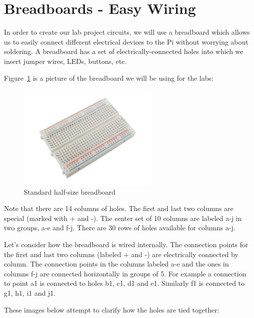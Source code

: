 \pagebreak

\section{Breadboards - Easy Wiring}


In order to create our lab project circuits, we will use
a breadboard which allows us to easily connect different
electrical devices to the Pi without worrying about soldering. A breadboard has a set of electrically-connected
holes into which we insert jumper wires, LEDs,
buttons, etc.

Figure~\ref{fig:breadboard} is a picture of the breadboard we will be using for the labs:

\begin{figure}[H]
	\centering
	\includegraphics[height=2in]{pi_images/half-size-breadboard-600x600_grande.jpg}
	\caption{Standard half-size breadboard}
	\label{fig:breadboard}
\end{figure}

Note that there are 14 columns of holes. The first and last two columns are special (marked with + and -). The center set of 10 columns are labeled a-j in two groups, a-e and f-j. There are 30 rows of holes available for columns a-j.

Let's consider how the breadboard is wired internally. The connection points for the first and last two columns (labeled + and -) are electrically connected by column. The connection points in the columns labeled a-e and the ones in columns f-j are connected horizontally in groups of 5. For example a connection to point a1 is connected to holes b1, c1, d1 and e1. Similarly f1 is connected to g1, h1, i1 and j1.

These images below attempt to clarify how the holes are tied together:


